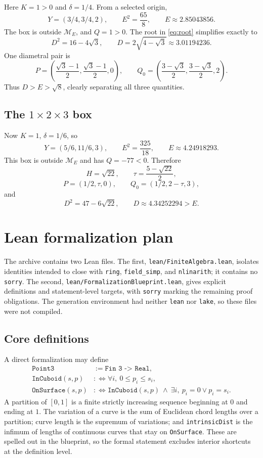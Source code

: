 \documentclass[11pt]{article}
\theoremstyle{definition}
\begin{document}
Here $K=1>0$ and $\delta=1/4$.  From a selected origin,
\[
  Y=(3/4,3/4,2),\qquad E^2=\frac{65}{8},
  \qquad E\approx2.85043856.
\]
The box is outside $\mathcal M_E$, and $Q=1>0$.  The root in
\eqref{eq:root} simplifies exactly to
\[
  D^2=16-4\sqrt3,
  \qquad D=2\sqrt{4-\sqrt3}\approx3.01194236.
\]
One diametral pair is
\[
 P=\left(\frac{\sqrt3-1}{2},\frac{\sqrt3-1}{2},0\right),\qquad
 Q_0=\left(\frac{3-\sqrt3}{2},\frac{3-\sqrt3}{2},2\right).
\]
Thus $D>E>\sqrt8$, clearly separating all three quantities.

\subsection{\texorpdfstring{The $1\times2\times3$ box}{The 1 x 2 x 3 box}}

Now $K=1$, $\delta=1/6$, so
\[
  Y=(5/6,11/6,3),\qquad E^2=\frac{325}{18},
  \qquad E\approx4.24918293.
\]
This box is outside $\mathcal M_E$ and has $Q=-77<0$.  Therefore
\[
 H=\sqrt{22},\qquad \tau=\frac{5-\sqrt{22}}2,
\]
\[
 P=(1/2,\tau,0),\qquad Q_0=(1/2,2-\tau,3),
\]
and
\[
  D^2=47-6\sqrt{22},\qquad D\approx4.34252294>E.
\]

\section{Lean formalization plan}\label{sec:lean}

The archive contains two Lean files.  The first,
\texttt{lean/FiniteAlgebra.lean}, isolates identities intended to close with
\texttt{ring}, \texttt{field\_simp}, and \texttt{nlinarith}; it contains no
\texttt{sorry}.  The second,
\texttt{lean/FormalizationBlueprint.lean}, gives explicit definitions and
statement-level targets, with \texttt{sorry} marking the remaining proof
obligations.  The generation environment had neither \texttt{lean} nor
\texttt{lake}, so these files were not compiled.

\subsection{Core definitions}

A direct formalization may define
\begin{align*}
 \texttt{Point3}&:=\texttt{Fin 3 -> Real},\\
 \texttt{InCuboid}(s,p)&:\Longleftrightarrow
       \forall i,\ 0\le p_i\le s_i,\\
 \texttt{OnSurface}(s,p)&:\Longleftrightarrow
       \texttt{InCuboid}(s,p)\ \wedge\
       \exists i,\ p_i=0\vee p_i=s_i.
\end{align*}
A partition of $[0,1]$ is a finite strictly increasing sequence beginning at
$0$ and ending at $1$.  The variation of a curve is the sum of Euclidean chord
lengths over a partition; curve length is the supremum of variations; and
\texttt{intrinsicDist} is the infimum of lengths of continuous curves that
stay on \texttt{OnSurface}.  These are spelled out in the blueprint, so the
formal statement excludes interior shortcuts at the definition level.
\end{document}
